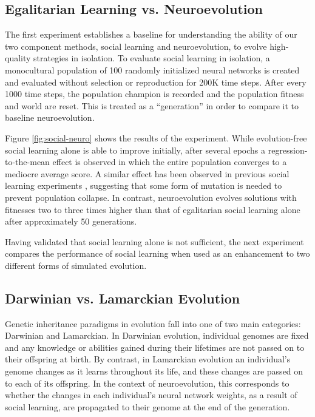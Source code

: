 \documentclass{sig-alternate}
\begin{document}
\subsection{Egalitarian Learning vs. Neuroevolution}

The first experiment establishes a baseline for understanding the ability of our two component methods, social learning and neuroevolution, to evolve high-quality strategies in isolation. To evaluate social learning in isolation, a monocultural population of 100 randomly initialized neural networks is created and evaluated without selection or reproduction for 200K time steps. After every 1000 time steps, the population champion is recorded and the population fitness and world are reset. This is treated as a ``generation'' in order to compare it to baseline neuroevolution.

Figure \ref{fig:social-neuro} shows the results of the experiment. While evolution-free social learning alone is able to improve initially, after several epochs a regression-to-the-mean effect is observed in which the entire population converges to a mediocre average score. A similar effect has been observed in previous social learning experiments \cite{denaro1996cultural}, suggesting that some form of mutation is needed to prevent population collapse. In contrast, neuroevolution evolves solutions with fitnesses two to three times higher than that of egalitarian social learning alone after approximately 50 generations.

Having validated that social learning alone is not sufficient, the next experiment compares the performance of social learning when used as an enhancement to two different forms of simulated evolution.

\subsection{Darwinian vs. Lamarckian Evolution}

Genetic inheritance paradigms in evolution fall into one of two main categories: Darwinian and Lamarckian. In Darwinian evolution, individual genomes are fixed and any knowledge or abilities gained during their lifetimes are not passed on to their offspring at birth. By contrast, in Lamarckian evolution an individual's genome changes as it learns throughout its life, and these changes are passed on to each of its offspring. In the context of neuroevolution, this corresponds to whether the changes in each individual's neural network weights, as a result of social learning, are propagated to their genome at the end of the generation.
\end{document}
